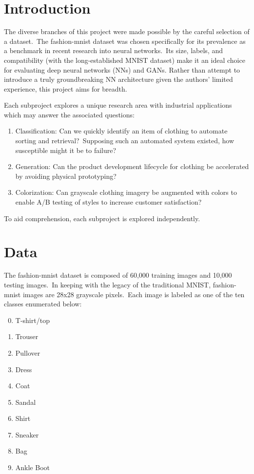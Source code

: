\documentclass[conference]{IEEEtran}
\begin{document}
    \section{Introduction}\label{sec:introduction}

    The diverse branches of this project were made possible by the careful selection of a dataset.\ The fashion-mnist dataset was chosen specifically for its prevalence as a benchmark in recent research into neural networks.\ Its size, labels, and compatibility (with the long-established MNIST dataset) make it an ideal choice for evaluating deep neural networks (NNs) and GANs. Rather than attempt to introduce a truly groundbreaking NN architecture given the authors' limited experience, this project aims for breadth.

    Each subproject explores a unique research area with industrial applications which may answer the associated questions:

    \begin{enumerate}
        \item Classification: Can we quickly identify an item of clothing to automate sorting and retrieval?\ Supposing such an automated system existed, how susceptible might it be to failure?
        \item Generation: Can the product development lifecycle for clothing be accelerated by avoiding physical prototyping?
        \item Colorization: Can grayscale clothing imagery be augmented with colors to enable A/B testing of styles to increase customer satisfaction?
    \end{enumerate}

    To aid comprehension, each subproject is explored independently.

    \section{Data}\label{sec:data}

    The fashion-mnist dataset is composed of 60,000 training images and 10,000 testing images.\ In keeping with the legacy of the traditional MNIST, fashion-mnist images are 28x28 grayscale pixels.\ Each image is labeled as one of the ten classes enumerated below:

    \begin{enumerate}
        \setcounter{enumi}{-1}
        \item T-shirt/top
        \item Trouser
        \item Pullover
        \item Dress
        \item Coat
        \item Sandal
        \item Shirt
        \item Sneaker
        \item Bag
        \item Ankle Boot
    \end{enumerate}
\end{document}

